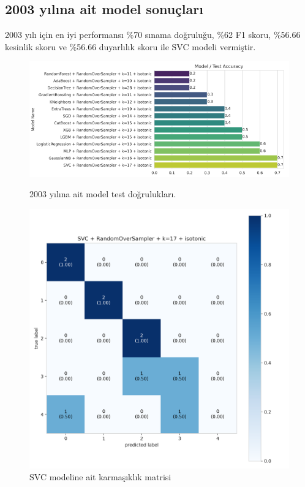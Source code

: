 \newpage

\subsection{2003 yılına ait model sonuçları}
2003 yılı için en iyi performansı \%70 sınama doğruluğu,  \%62 F1 skoru, \%56.66 kesinlik skoru ve \%56.66 duyarlılık skoru ile SVC modeli vermiştir.

\begin{figure}[ht]
\centering
\begin{minipage}[b]{0.7\textwidth}
    \centering
    \includegraphics[width=\textwidth]{2003.png}
    \caption{2003 yılına ait model test doğrulukları.}
    \label{fig:resim1}
\end{minipage}
\hfill
\begin{minipage}[b]{0.6\textwidth}
    \centering
    \includegraphics[width=\textwidth]{2003_cm.png}
    \caption{SVC modeline ait karmaşıklık matrisi}
    \label{fig:resim2}
\end{minipage}
\end{figure}

